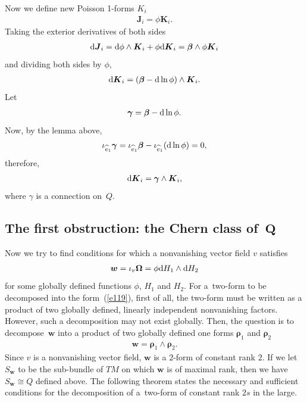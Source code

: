 \documentclass[pdftex]{sigma}
\numberwithin{equation}{section}
\begin{document}
Now we def\/ine new Poisson 1-forms $K_{i}$
\begin{gather*}
\boldsymbol{J}_{i}=\phi \boldsymbol{K}_{i}.
\end{gather*}
Taking the exterior derivatives of both sides
\begin{gather*}
{\rm d}\boldsymbol{J}_{i}={\rm d}\phi \wedge \boldsymbol{K}_{i}+\phi {\rm d}\boldsymbol{K}_{i}=\boldsymbol{\beta }\wedge \phi \boldsymbol{K}_{i}
\end{gather*}
and dividing both sides by $\phi $,
\begin{gather*}
{\rm d}\boldsymbol{K}_{i}= ( \boldsymbol{\beta }-{\rm d}\ln \phi ) \wedge \boldsymbol{K}_{i}.
\end{gather*}
Let
\begin{gather*}
\boldsymbol{\gamma }=\boldsymbol{\beta }-{\rm d}\ln \phi.
\end{gather*}
Now, by the lemma above,
\begin{gather}
\iota _{\widehat{e}_{1}}\boldsymbol{\gamma }=\iota _{\widehat{e}_{1}}\boldsymbol{\beta }-\iota _{\widehat{e}_{1}} ( {\rm d}\ln \phi ) =0, \label{e117}
\end{gather}
therefore,
\begin{gather}
{\rm d}\boldsymbol{K}_{i}=\boldsymbol{\gamma }\wedge \boldsymbol{K}_{i}, \label{e118}
\end{gather}
where $\gamma $ is a connection on~$Q$.

\subsection[The f\/irst obstruction: the Chern class of $Q$]{The f\/irst obstruction: the Chern class of~$\boldsymbol{Q}$}\label{section3.2}

Now we try to f\/ind conditions for which a nonvanishing vector f\/ield $v$ satisf\/ies
\begin{gather}
\boldsymbol{w}=\iota _{v}\boldsymbol{\Omega }=\phi {\rm d}H_{1}\wedge {\rm d}H_{2} \label{e119}
\end{gather}
for some globally def\/ined functions $\phi $, $H_{1}$ and $H_{2}$. For a~two-form to be decomposed into the form~(\ref{e119}), f\/irst of all, the two-form must be written as a product of two globally def\/ined, linearly independent nonvanishing factors. However, such a decomposition may not exist globally. Then, the question is to decompose~$\boldsymbol{w}$ into a product of two globally def\/ined one forms $\boldsymbol{\rho }_{1}$ and $\boldsymbol{\rho }_{2}$
\begin{gather}
\boldsymbol{w}=\boldsymbol{\rho }_{1}\wedge \boldsymbol{\rho }_{2}. \label{e123}
\end{gather}
Since $v$ is a nonvanishing vector f\/ield, $\boldsymbol{w}$ is a $2$-form of constant rank $2$. If we let $S_{\boldsymbol{w}}$ to be the sub-bundle of $TM$ on which $\boldsymbol{w}$ is of maximal rank, then we have $S_{\boldsymbol{w}}\cong Q $ def\/ined above. The following theorem states the necessary and suf\/f\/icient conditions for the decomposition of a~two-form of constant rank $2s$ in the large.
\end{document}
